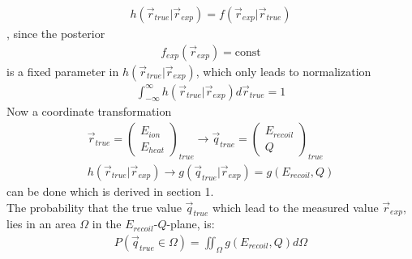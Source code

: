 \begin{gather}
h(\vec{r}_{true} | \vec{r}_{exp}) = f(\vec{r}_{exp} | \vec{r}_{true})
\end{gather}
, since the posterior 
\begin{gather}
f_{exp}(\vec{r}_{exp}) = \mbox{const}
\end{gather}
is a fixed parameter in $h(\vec{r}_{true} | \vec{r}_{exp})$,
which only leads to normalization
\begin{gather}
\int_{-\infty}^{\infty} h(\vec{r}_{true} | \vec{r}_{exp}) d \vec{r}_{true} = 1
\end{gather}
Now a coordinate transformation 
\begin{gather}
\vec{r}_{true} = \begin{pmatrix} E_{ion} \\ E_{heat} \end{pmatrix}_{true} \rightarrow \vec{q}_{true} = \begin{pmatrix} E_{recoil} \\ Q \end{pmatrix}_{true} \\
h(\vec{r}_{true} | \vec{r}_{exp}) \rightarrow g(\vec{q}_{true} | \vec{r}_{exp}) = g(E_{recoil},Q)
\end{gather}
can be done which is derived in section 1. \\
The probability that the true value $\vec{q}_{true}$ which lead to the measured value $\vec{r}_{exp}$, lies in an area $\Omega$ in the $E_{recoil}$-$Q$-plane, is:
\begin{gather}
P(\vec{q}_{true} \in \Omega) = \iint_\Omega g(E_{recoil},Q) d\Omega
\end{gather}
